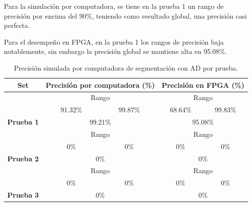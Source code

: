 \documentclass[twoside,spanish,ESP,MSc]{plantillaLabUPV}
\theoremstyle{definition}
\begin{document}
Para la simulación por computadora, se tiene en la prueba 1 un rango de precisión por encima del 90\%, teniendo como resultado global, una precisión casi perfecta.

Para el desempeño en FPGA, en la prueba 1 los rangos de precisión baja notablemente, sin embargo la precisión global se mantiene alta en 95.08\%.


\begin{table}[h]
	\caption{Precisión simulada por computadora de segmentación con AD por prueba.}
	\label{acurasgm}
	\centering
	\begin{tabular}{|c|c|c|c|c|}
		\hline
		\textbf{Set}                        & \multicolumn{2}{c|}{\textbf{Precisión por computadora (\%)}} & \multicolumn{2}{c|}{\textbf{Precisión en FPGA (\%)}} \\ \hline
		& \multicolumn{2}{c|}{{\color[HTML]{000000} Rango}}            & \multicolumn{2}{c|}{{\color[HTML]{000000} Rango}}    \\ \cline{2-5} 
		& 91.32\%                       & 99.87\%                      & 68.64\%                       & 99.83\%                      \\ \cline{2-5} 
		\multirow{-3}{*}{\textbf{Prueba 1}} & \multicolumn{2}{c|}{99.21\%}                                 & \multicolumn{2}{c|}{95.08\%}                             \\ \hline
		& \multicolumn{2}{c|}{{\color[HTML]{000000} Rango}}            & \multicolumn{2}{c|}{{\color[HTML]{000000} Rango}}    \\ \cline{2-5} 
		& 0\%                           & 0\%                          & 0\%                       & 0\%                      \\ \cline{2-5} 
		\multirow{-3}{*}{\textbf{Prueba 2}} & \multicolumn{2}{c|}{0\%}                                     & \multicolumn{2}{c|}{0\%}                             \\ \hline
		& \multicolumn{2}{c|}{{\color[HTML]{000000} Rango}}            & \multicolumn{2}{c|}{{\color[HTML]{000000} Rango}}    \\ \cline{2-5} 
		& 0\%                           & 0\%                          & 0\%                       & 0\%                      \\ \cline{2-5} 
		\multirow{-3}{*}{\textbf{Prueba 3}} & \multicolumn{2}{c|}{0\%}                                     & \multicolumn{2}{c|}{0\%}                             \\ \hline
	\end{tabular}
\end{table}
\end{document}
